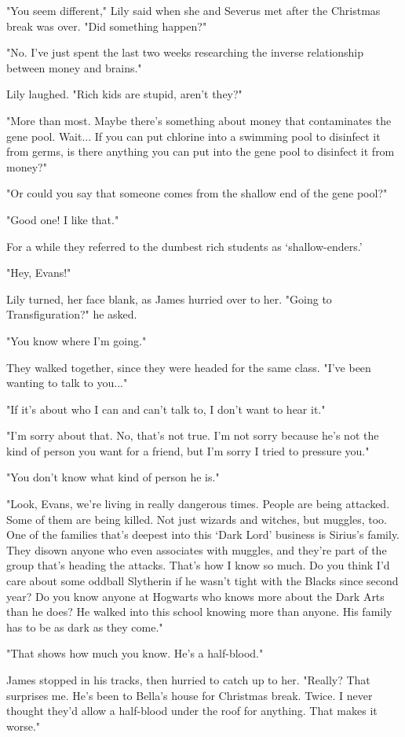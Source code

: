 \documentclass[a4paper,11pt]{article}
\begin{document}
"You seem different," Lily said when she and Severus met after the Christmas break was over. "Did something happen?"

"No. I've just spent the last two weeks researching the inverse relationship between money and brains."

Lily laughed. "Rich kids are stupid, aren't they?"

"More than most. Maybe there's something about money that contaminates the gene pool. Wait... If you can put chlorine into a swimming pool to disinfect it from germs, is there anything you can put into the gene pool to disinfect it from money?"

"Or could you say that someone comes from the shallow end of the gene pool?"

"Good one! I like that."

For a while they referred to the dumbest rich students as `shallow-enders.'

"Hey, Evans!"

Lily turned, her face blank, as James hurried over to her. "Going to Transfiguration?" he asked.

"You know where I'm going."

They walked together, since they were headed for the same class. "I've been wanting to talk to you..."

"If it's about who I can and can't talk to, I don't want to hear it."

"I'm sorry about that. No, that's not true. I'm not sorry because he's not the kind of person you want for a friend, but I'm sorry I tried to pressure you."

"You don't know what kind of person he is."

"Look, Evans, we're living in really dangerous times. People are being attacked. Some of them are being killed. Not just wizards and witches, but muggles, too. One of the families that's deepest into this `Dark Lord' business is Sirius's family. They disown anyone who even associates with muggles, and they're part of the group that's heading the attacks. That's how I know so much. Do you think I'd care about some oddball Slytherin if he wasn't tight with the Blacks since second year? Do you know anyone at Hogwarts who knows more about the Dark Arts than he does? He walked into this school knowing more than anyone. His family has to be as dark as they come."

"That shows how much you know. He's a half-blood."

James stopped in his tracks, then hurried to catch up to her. "Really? That surprises me. He's been to Bella's house for Christmas break. Twice. I never thought they'd allow a half-blood under the roof for anything. That makes it worse."
\end{document}
